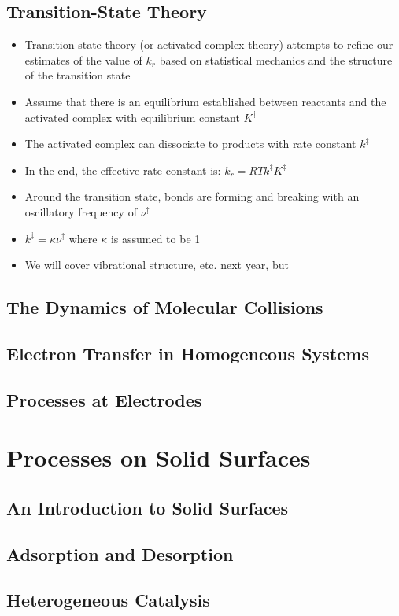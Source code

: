 \documentclass[12pt, openany, letterpaper]{memoir}
\begin{document}
\section{Transition-State Theory}
\begin{itemize}
	\item Transition state theory (or activated complex theory) attempts to refine our estimates of the value of $k_r$ based on statistical mechanics and the structure of the transition state
	\item Assume that there is an equilibrium established between reactants and the activated complex  with equilibrium constant $K^{\ddagger}$
	\item The activated complex can dissociate to products with rate constant $k^{\ddagger}$
	\item In the end, the effective rate constant is: $k_r=RTk^{\ddagger}K^{\ddagger}$
	\item Around the transition state, bonds are forming and breaking with an oscillatory frequency of $\nu^{\ddagger}$
	\item $k^{\ddagger}=\kappa\nu^{\ddagger}$ where $\kappa$ is assumed to be 1
	\item We will cover vibrational structure, etc. next year, but
\end{itemize}
\section{The Dynamics of Molecular Collisions}

\section{Electron Transfer in Homogeneous Systems}

\section{Processes at Electrodes}

\chapter{Processes on Solid Surfaces}
\section{An Introduction to Solid Surfaces}

\section{Adsorption and Desorption}

\section{Heterogeneous Catalysis}
\end{document}
